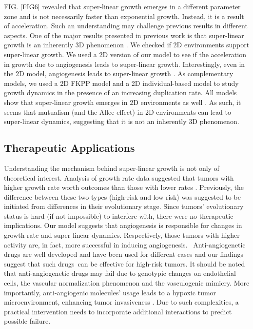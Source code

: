 \documentclass[aps,prl, superscriptaddress,groupedaddress]{revtex4}  %
\begin{document}
	FIG. \ref{FIG6} revealed that super-linear growth emerges in a different parameter zone and is not necessarily faster than exponential growth. Instead, it is a result of acceleration. Such an understanding may challenge previous results in different aspects. One of the major results presented in previous work is that super-linear growth is an inherently 3D phenomenon \cite{Victor2020superlinear}. We checked if 2D environments support super-linear growth. We used a 2D version of our model to see if the acceleration in growth due to angiogenesis leads to super-linear growth. Interestingly, even in the 2D model, angiogenesis leads to super-linear growth \cite{supplemtal}. As complementary models, we used a 2D FKPP model \cite{azimzade2019effect} and a 2D individual-based model \cite{azimzade2019short} to study growth dynamics in the presence of an increasing duplication rate. All models show that super-linear growth emerges in 2D environments as well  \cite{supplemtal}. As such, it seems that mutualism (and the Allee effect) in 2D environments can lead to super-linear dynamics, suggesting that it is not an inherently 3D phenomenon.
	
	
	
	
	\subsection{Therapeutic Applications} 
	Understanding the mechanism behind super-linear growth is not only of theoretical interest. Analysis of growth rate data suggested that tumors with higher growth rate worth outcomes than those with lower rates \cite{Victor2020superlinear}. Previously, the difference between these two types (high-risk and low risk) was suggested to be initiated from differences in their evolutionary stage. Since tumors' evolutionary status is hard (if not impossible) to interfere with, there were no therapeutic implications. Our model suggests that angiogenesis is responsible for changes in growth rate and super-linear dynamics. Respectively, those tumors with higher activity are, in fact, more successful in inducing angiogenesis.  Anti-angiogenetic drugs are well developed and have been used for different cases and our findings suggest that such drugs can be effective for high-risk tumors.	 It should be noted that anti-angiogenetic drugs may fail due to genotypic changes on endothelial cells, the vascular normalization phenomenon  and the vasculogenic mimicry. More importantly, anti-angiogenic molecules' usage leads to a hypoxic tumor microenvironment, enhancing tumor invasiveness  \cite{ribatti2019limitations}. Due to such complexities, a practical intervention needs to incorporate additional interactions to predict possible failure.  
	
\end{document}
